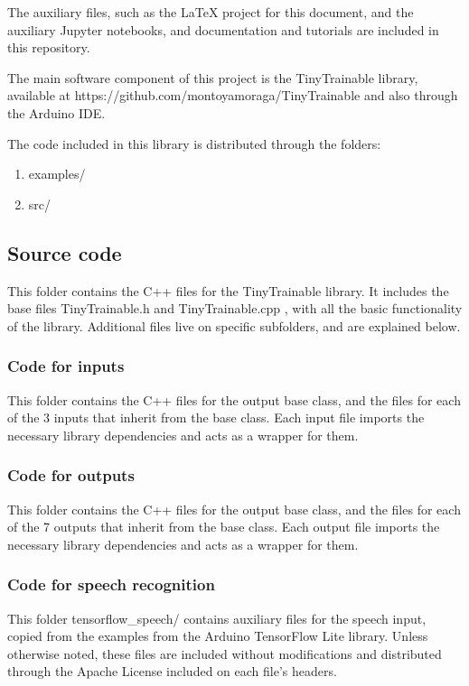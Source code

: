The auxiliary files, such as the LaTeX project for this document, and the auxiliary Jupyter notebooks, and documentation and tutorials are included in this repository.

The main software component of this project is the TinyTrainable library, available at https://github.com/montoyamoraga/TinyTrainable and also through the Arduino \acrshort{IDE}.

The code included in this library is distributed through the folders:

\begin{enumerate}
  \item examples/
  \item src/
\end{enumerate}

\subsection{Source code}

This folder contains the C++ files for the TinyTrainable library. It includes the base files TinyTrainable.h and TinyTrainable.cpp , with all the basic functionality of the library. Additional files live on specific subfolders, and are explained below.

\subsubsection{Code for inputs}

This folder contains the C++ files for the output base class, and the files for each of the 3 inputs that inherit from the base class. Each input file imports the necessary library dependencies and acts as a wrapper for them.

\subsubsection{Code for outputs}

This folder contains the C++ files for the output base class, and the files for each of the 7 outputs that inherit from the base class. Each output file imports the necessary library dependencies and acts as a wrapper for them.

\subsubsection{Code for speech recognition}

This folder tensorflow{\_}speech/ contains auxiliary files for the speech input, copied from the examples from the Arduino TensorFlow Lite library. Unless otherwise noted, these files are included without modifications and distributed through the Apache License included on each file's headers.

